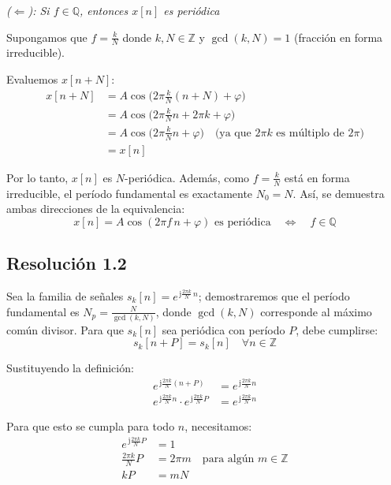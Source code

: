 \documentclass[
  11pt,
  letterpaper,
   addpoints,
  ]{exam}
\begin{document}
\begin{questions}
\begin{solution}
\emph{(\(\Leftarrow\)): Si \(f \in \mathbb{Q}\), entonces \(x[n]\) es periódica}

Supongamos que \(f = \frac{k}{N}\) donde \(k, N \in \mathbb{Z}\) y \(\gcd(k,N) = 1\) (fracción en forma irreducible).

Evaluemos \(x[n+N]\):
\begin{align}
x[n+N] &= A\cos\!\Big(2\pi \frac{k}{N}(n+N)+\varphi\Big) \\
&= A\cos\!\Big(2\pi\frac{k}{N}n + 2\pi k + \varphi\Big) \\
&= A\cos\!\big(2\pi\frac{k}{N}n + \varphi\big) \quad \text{(ya que } 2\pi k \text{ es múltiplo de } 2\pi\text{)} \\
&= x[n]
\end{align}

Por lo tanto, \(x[n]\) es \(N\)-periódica. Además, como \(f = \frac{k}{N}\) está en forma irreducible, el período fundamental es exactamente \(N_0 = N\). Así, se demuestra ambas direcciones de la equivalencia:
\begin{equation}
\boxed{x[n] = A\cos(2\pi f\,n+\varphi) \text{ es periódica} \quad \Longleftrightarrow \quad f \in \mathbb{Q}}
\end{equation}

\subsection*{Resolución 1.2}

Sea la familia de señales \(s_k[n] = e^{\,\mathrm{j}\frac{2\pi k}{N}\,n}\); demostraremos que el período fundamental es \(N_p = \frac{N}{\gcd(k,N)}\), donde $\gcd(k,N)$ corresponde al máximo común divisor. Para que \(s_k[n]\) sea periódica con período \(P\), debe cumplirse:
\begin{equation}
s_k[n+P] = s_k[n] \quad \forall n \in \mathbb{Z}
\end{equation}

Sustituyendo la definición:
\begin{align}
e^{\,\mathrm{j}\frac{2\pi k}{N}(n+P)} &= e^{\,\mathrm{j}\frac{2\pi k}{N}n} \\
e^{\,\mathrm{j}\frac{2\pi k}{N}n} \cdot e^{\,\mathrm{j}\frac{2\pi k}{N}P} &= e^{\,\mathrm{j}\frac{2\pi k}{N}n}
\end{align}

Para que esto se cumpla para todo \(n\), necesitamos:
\begin{align}
e^{\,\mathrm{j}\frac{2\pi k}{N}P} &= 1 \\
\frac{2\pi k}{N}P &= 2\pi m \quad \text{para algún } m \in \mathbb{Z} \\
kP &= mN \label{eq:condicion_periodo}
\end{align}


\end{solution}
\end{questions}
\end{document}
